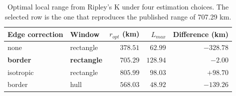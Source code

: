 \begin{table}[!ht]
\centering
\caption{Optimal local range from Ripley's K under four estimation choices. The selected row is the one that reproduces the published range of 707.29 km.}
\label{tab:local-range}
\begin{tabular}{llrrr}
\hline
Edge correction & Window & $r_{opt}$ (km) & $L_{max}$ & Difference (km) \\
\hline
none & rectangle & $378.51$ & $62.99$ & $-328.78$ \\
\textbf{border} & \textbf{rectangle} & \textbf{$705.29$} & \textbf{$128.94$} & \textbf{$-2.00$} \\
isotropic & rectangle & $805.99$ & $98.03$ & $+98.70$ \\
border & hull & $568.03$ & $48.92$ & $-139.26$ \\
\hline
\end{tabular}
\end{table}
